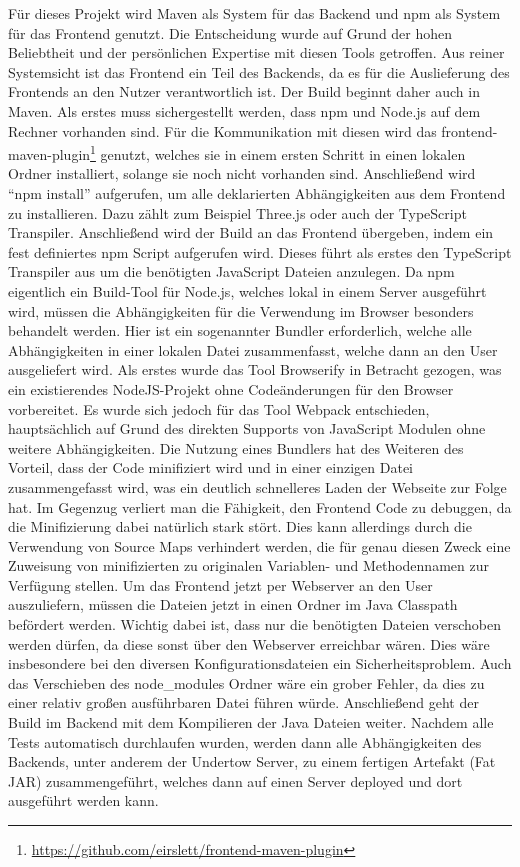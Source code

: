 Für dieses Projekt wird Maven als System für das Backend und npm als System für das Frontend genutzt. Die Entscheidung wurde auf Grund der hohen Beliebtheit und der persönlichen Expertise mit diesen Tools getroffen. Aus reiner Systemsicht ist das Frontend ein Teil des Backends, da es für die Auslieferung des Frontends an den Nutzer verantwortlich ist. Der Build beginnt daher auch in Maven. Als erstes muss sichergestellt werden, dass npm und Node.js auf dem Rechner vorhanden sind. Für die Kommunikation mit diesen wird das frontend-maven-plugin\footnote{\url{https://github.com/eirslett/frontend-maven-plugin}} genutzt, welches sie in einem ersten Schritt in einen lokalen Ordner installiert, solange sie noch nicht vorhanden sind. Anschließend wird “npm install” aufgerufen, um alle deklarierten Abhängigkeiten aus dem Frontend zu installieren. Dazu zählt zum Beispiel Three.js oder auch der TypeScript Transpiler. Anschließend wird der Build an das Frontend übergeben, indem ein fest definiertes npm Script aufgerufen wird. Dieses führt als erstes den TypeScript Transpiler aus um die benötigten JavaScript Dateien anzulegen. Da npm eigentlich ein Build-Tool für Node.js, welches lokal in einem Server ausgeführt wird, müssen die Abhängigkeiten für die Verwendung im Browser besonders behandelt werden. Hier ist ein sogenannter Bundler erforderlich, welche alle Abhängigkeiten in einer lokalen Datei zusammenfasst, welche dann an den User ausgeliefert wird. Als erstes wurde das Tool Browserify in Betracht gezogen, was ein existierendes NodeJS-Projekt ohne Codeänderungen für den Browser vorbereitet. Es wurde sich jedoch für das Tool Webpack entschieden, hauptsächlich auf Grund des direkten Supports von JavaScript Modulen ohne weitere Abhängigkeiten. Die Nutzung eines Bundlers hat des Weiteren des Vorteil, dass der Code minifiziert wird und in einer einzigen Datei zusammengefasst wird, was ein deutlich schnelleres Laden der Webseite zur Folge hat. Im Gegenzug verliert man die Fähigkeit, den Frontend Code zu debuggen, da die Minifizierung dabei natürlich stark stört. Dies kann allerdings durch die Verwendung von Source Maps verhindert werden, die für genau diesen Zweck eine Zuweisung von minifizierten zu originalen Variablen- und Methodennamen zur Verfügung stellen. Um das Frontend jetzt per Webserver an den User auszuliefern, müssen die Dateien jetzt in einen Ordner im Java Classpath befördert werden. Wichtig dabei ist, dass nur die benötigten Dateien verschoben werden dürfen, da diese sonst über den Webserver erreichbar wären. Dies wäre insbesondere bei den diversen Konfigurationsdateien ein Sicherheitsproblem. Auch das Verschieben des node\_modules Ordner wäre ein grober Fehler, da dies zu einer relativ großen ausführbaren Datei führen würde. Anschließend geht der Build im Backend mit dem Kompilieren der Java Dateien weiter. Nachdem alle Tests automatisch durchlaufen wurden, werden dann alle Abhängigkeiten des Backends, unter anderem der Undertow Server, zu einem fertigen Artefakt (Fat JAR) zusammengeführt, welches dann auf einen Server deployed und dort ausgeführt werden kann.


